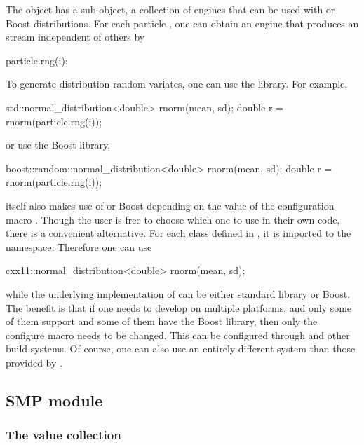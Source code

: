 The  object has a sub-object, a collection of \rng engines
that can be used with \cppoo{}  or Boost distributions. For
each particle , one can obtain an engine that produces an \rng stream
independent of others by
\begin{cppcode}
particle.rng(i);
\end{cppcode}
To generate distribution random variates, one can use the
\cppoo{}  library. For example,
\begin{cppcode}
std::normal_distribution<double> rnorm(mean, sd);
double r = rnorm(particle.rng(i));
\end{cppcode}
or use the Boost library,
\begin{cppcode}
boost::random::normal_distribution<double> rnorm(mean, sd);
double r = rnorm(particle.rng(i));
\end{cppcode}
\vsmc itself also makes use of \cppoo{}  or Boost depending
on the value of the configuration macro .
Though the user is free to choose which one to use in their own code, there is
a convenient alternative. For each class defined in \cppoo{} ,
it is imported to the  namespace. Therefore one can use
\begin{cppcode}
cxx11::normal_distribution<double> rnorm(mean, sd);
\end{cppcode}
while the underlying implementation of  can be
either \cppoo standard library or Boost. The benefit is that if one needs to
develop on multiple platforms, and only some of them support \cppoo and some
of them have the Boost library, then only the configure macro
 needs to be changed. This can be configured
through \cmake and other build systems. Of course, one can also use an
entirely different \rng system than those provided by \vsmc.

\subsection{SMP module}
\label{sub:SMP module}

\subsubsection{The value collection}

